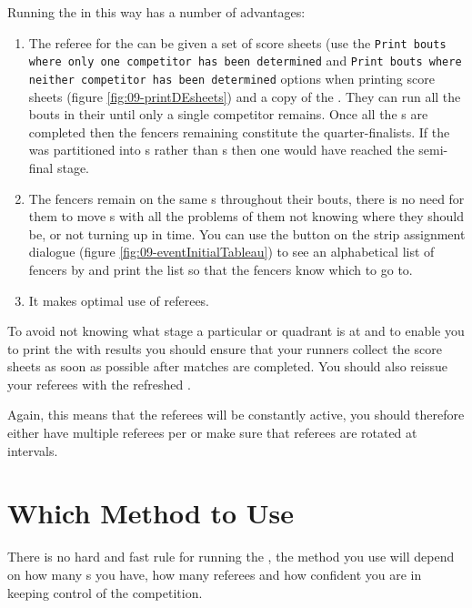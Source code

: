 \documentclass[a4paper,11pt]{memoir}
\begin{document}
Running the  in this way has a number of advantages:

\begin{enumerate}
 \item The referee for the  can be given a set of score sheets (use the \texttt{Print bouts where only one competitor has been determined} and \texttt{Print bouts where neither competitor has been determined} options when printing score sheets (figure \ref{fig:09-printDEsheets}) and a copy of the . They can run all the bouts in their  until only a single competitor remains. Once all the s are completed then the fencers remaining constitute the quarter-finalists. If the  was partitioned into s rather than s then one would have reached the semi-final stage.
 \item The fencers remain on the same s throughout their bouts, there is no need for them to move s with all the problems of them not knowing where they should be, or not turning up in time. You can use the  button on the \gls{strip} assignment dialogue (figure \ref{fig:09-eventInitialTableau}) to see an alphabetical list of fencers by  and print the list so that the fencers know which  to go to.
 \item It makes optimal use of referees.
\end{enumerate}

To avoid not knowing what stage a particular  or quadrant is at and to enable you to print the  with results you should ensure that your runners collect the score sheets as soon as possible after matches are completed. You should also reissue your referees with the refreshed .

Again, this means that the referees will be constantly active, you should therefore either have multiple referees per  or make sure that referees are rotated at intervals.

\section{Which Method to Use}

There is no hard and fast rule for running the , the method you use will depend on how many s you have, how many referees and how confident you are in keeping control of the competition. 
\end{document}
